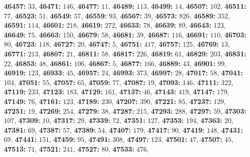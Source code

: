 \textsf{\bfseries 46457:} $33$, \textsf{\bfseries 46471:} $146$, \textsf{\bfseries 46477:} $11$, \textsf{\bfseries 46489:} $113$, \textsf{\bfseries 46499:} $14$, \textsf{\bfseries 46507:} $102$, \textsf{\bfseries 46511:} $77$, \textsf{\bfseries 46523:} $51$, \textsf{\bfseries 46549:} $57$, \textsf{\bfseries 46559:} $93$, \textsf{\bfseries 46567:} $39$, \textsf{\bfseries 46573:} $826$, \textsf{\bfseries 46589:} $352$, \textsf{\bfseries 46591:} $114$, \textsf{\bfseries 46601:} $218$, \textsf{\bfseries 46619:} $272$, \textsf{\bfseries 46633:} $78$, \textsf{\bfseries 46639:} $89$, \textsf{\bfseries 46643:} $123$, \textsf{\bfseries 46649:} $75$, \textsf{\bfseries 46663:} $150$, \textsf{\bfseries 46679:} $58$, \textsf{\bfseries 46681:} $39$, \textsf{\bfseries 46687:} $116$, \textsf{\bfseries 46691:} $110$, \textsf{\bfseries 46703:} $80$, \textsf{\bfseries 46723:} $118$, \textsf{\bfseries 46727:} $20$, \textsf{\bfseries 46747:} $5$, \textsf{\bfseries 46751:} $417$, \textsf{\bfseries 46757:} $125$, \textsf{\bfseries 46769:} $13$, \textsf{\bfseries 46771:} $213$, \textsf{\bfseries 46807:} $21$, \textsf{\bfseries 46811:} $58$, \textsf{\bfseries 46817:} $226$, \textsf{\bfseries 46819:} $61$, \textsf{\bfseries 46829:} $203$, \textsf{\bfseries 46831:} $22$, \textsf{\bfseries 46853:} $48$, \textsf{\bfseries 46861:} $106$, \textsf{\bfseries 46867:} $5$, \textsf{\bfseries 46877:} $166$, \textsf{\bfseries 46889:} $43$, \textsf{\bfseries 46901:} $99$, \textsf{\bfseries 46919:} $123$, \textsf{\bfseries 46933:} $45$, \textsf{\bfseries 46957:} $24$, \textsf{\bfseries 46993:} $373$, \textsf{\bfseries 46997:} $28$, \textsf{\bfseries 47017:} $58$, \textsf{\bfseries 47041:} $104$, \textsf{\bfseries 47051:} $55$, \textsf{\bfseries 47057:} $65$, \textsf{\bfseries 47059:} $77$, \textsf{\bfseries 47087:} $19$, \textsf{\bfseries 47093:} $146$, \textsf{\bfseries 47111:} $322$, \textsf{\bfseries 47119:} $233$, \textsf{\bfseries 47123:} $183$, \textsf{\bfseries 47129:} $161$, \textsf{\bfseries 47137:} $46$, \textsf{\bfseries 47143:} $419$, \textsf{\bfseries 47147:} $179$, \textsf{\bfseries 47149:} $76$, \textsf{\bfseries 47161:} $123$, \textsf{\bfseries 47189:} $230$, \textsf{\bfseries 47207:} $390$, \textsf{\bfseries 47221:} $85$, \textsf{\bfseries 47237:} $129$, \textsf{\bfseries 47251:} $19$, \textsf{\bfseries 47269:} $254$, \textsf{\bfseries 47279:} $38$, \textsf{\bfseries 47287:} $215$, \textsf{\bfseries 47293:} $288$, \textsf{\bfseries 47297:} $59$, \textsf{\bfseries 47303:} $107$, \textsf{\bfseries 47309:} $10$, \textsf{\bfseries 47317:} $29$, \textsf{\bfseries 47339:} $72$, \textsf{\bfseries 47351:} $127$, \textsf{\bfseries 47353:} $194$, \textsf{\bfseries 47363:} $20$, \textsf{\bfseries 47381:} $69$, \textsf{\bfseries 47387:} $57$, \textsf{\bfseries 47389:} $54$, \textsf{\bfseries 47407:} $179$, \textsf{\bfseries 47417:} $90$, \textsf{\bfseries 47419:} $148$, \textsf{\bfseries 47431:} $69$, \textsf{\bfseries 47441:} $151$, \textsf{\bfseries 47459:} $95$, \textsf{\bfseries 47491:} $308$, \textsf{\bfseries 47497:} $123$, \textsf{\bfseries 47501:} $47$, \textsf{\bfseries 47507:} $45$, \textsf{\bfseries 47513:} $71$, \textsf{\bfseries 47521:} $241$, \textsf{\bfseries 47527:} $80$, \textsf{\bfseries 47533:} $476$, 
